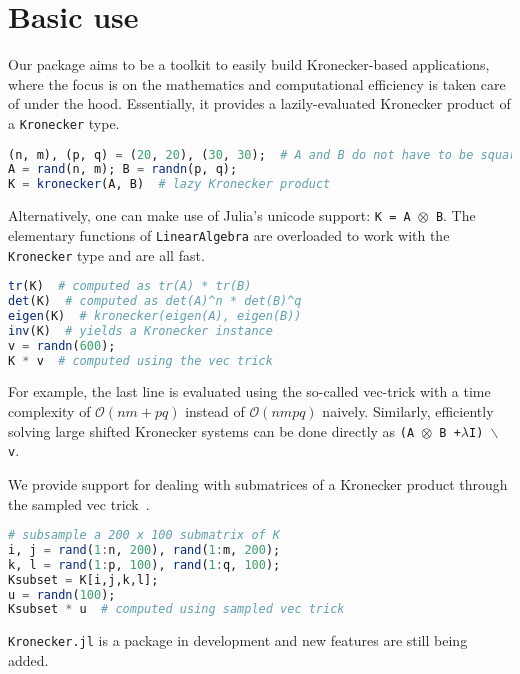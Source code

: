 \documentclass{juliacon}
\begin{document}
\section{Basic use}

Our package aims to be a toolkit to easily build Kronecker-based applications, where the focus is on the mathematics and computational efficiency is taken care of under the hood. Essentially, it provides a lazily-evaluated Kronecker product of a \texttt{Kronecker} type.

\begin{lstlisting}[language = Julia]
(n, m), (p, q) = (20, 20), (30, 30);  # A and B do not have to be square
A = rand(n, m); B = randn(p, q);
K = kronecker(A, B)  # lazy Kronecker product
\end{lstlisting}

Alternatively, one can make use of Julia's unicode support: \texttt{K = A $\otimes$ B}.
The elementary functions of \texttt{LinearAlgebra} are overloaded to work with the \texttt{Kronecker} type and are all fast.

\begin{lstlisting}[language = Julia]
tr(K)  # computed as tr(A) * tr(B)
det(K)  # computed as det(A)^n * det(B)^q
eigen(K)  # kronecker(eigen(A), eigen(B))
inv(K)  # yields a Kronecker instance
v = randn(600);
K * v  # computed using the vec trick
\end{lstlisting}

For example, the last line is evaluated using the so-called vec-trick with a time complexity of $\mathcal{O}(nm+pq)$ instead of $\mathcal{O}(nmpq)$ naively.
Similarly, efficiently solving large shifted Kronecker systems can be done directly as \texttt{(A $\otimes$ B +$\lambda$I) $\backslash$ v}.

We provide support for dealing with submatrices of a Kronecker product through the sampled vec trick~\cite{Airola2017genvectric}.

\begin{lstlisting}[language = Julia]
# subsample a 200 x 100 submatrix of K
i, j = rand(1:n, 200), rand(1:m, 200);
k, l = rand(1:p, 100), rand(1:q, 100);
Ksubset = K[i,j,k,l];
u = randn(100);
Ksubset * u  # computed using sampled vec trick
\end{lstlisting}

\texttt{Kronecker.jl} is a package in development and new features are still being added.
\end{document}
